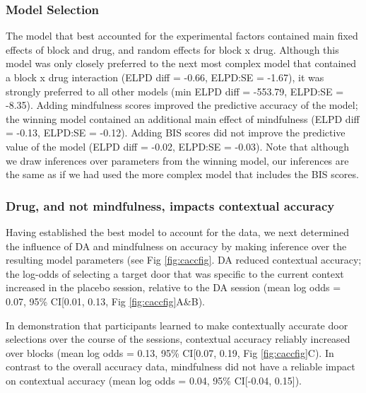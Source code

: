 \documentclass{article}
\begin{document}
\hypertarget{model-selection-1}{%
\subsubsection{Model Selection}\label{model-selection-1}}

The model that best accounted for the experimental factors contained
main fixed effects of block and drug, and random effects for block x
drug. Although this model was only closely preferred to the next most
complex model that contained a block x drug interaction (ELPD diff =
-0.66, ELPD:SE = -1.67), it was strongly preferred to all other models
(min ELPD diff = -553.79, ELPD:SE = -8.35). Adding mindfulness scores
improved the predictive accuracy of the model; the winning model
contained an additional main effect of mindfulness (ELPD diff = -0.13,
ELPD:SE = -0.12). Adding BIS scores did not improve the predictive value
of the model (ELPD diff = -0.02, ELPD:SE = -0.03). Note that although we
draw inferences over parameters from the winning model, our inferences
are the same as if we had used the more complex model that includes the
BIS scores.

\hypertarget{drug-and-not-mindfulness-impacts-contextual-accuracy}{%
\subsubsection{Drug, and not mindfulness, impacts contextual
accuracy}\label{drug-and-not-mindfulness-impacts-contextual-accuracy}}

Having established the best model to account for the data, we next
determined the influence of DA and mindfulness on accuracy by making
inference over the resulting model parameters (see Fig
\ref{fig:caccfig}. DA reduced contextual accuracy; the log-odds of
selecting a target door that was specific to the current context
increased in the placebo session, relative to the DA session (mean log
odds = 0.07, 95\% CI{[}0.01, 0.13, Fig \ref{fig:caccfig}A\&B).

In demonstration that participants learned to make contextually accurate
door selections over the course of the sessions, contextual accuracy
reliably increased over blocks (mean log odds = 0.13, 95\% CI{[}0.07,
0.19, Fig \ref{fig:caccfig}C). In contrast to the overall accuracy data,
mindfulness did not have a reliable impact on contextual accuracy (mean
log odds = 0.04, 95\% CI{[}-0.04, 0.15{]}).
\end{document}
